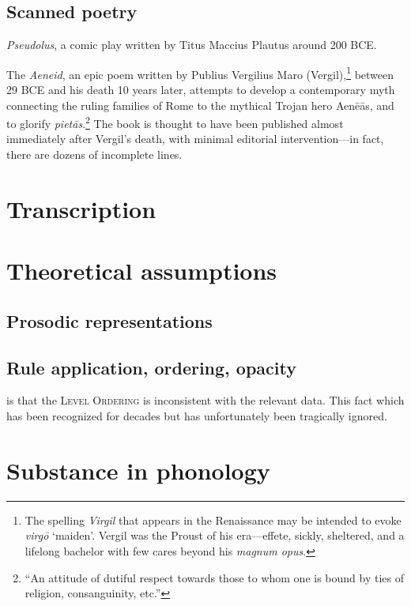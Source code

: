 \subsection{Scanned poetry}

\emph{Pseudolus}, a comic play written by Titus Maccius Plautus around 200 BCE.

The \emph{Aeneid}, an epic poem written by Publius Vergilius Maro (Vergil),\footnote{
    The spelling \emph{Virgil} that appears in the Renaissance may be intended to evoke \emph{virgō} `maiden'. Vergil was the Proust of his era---effete, sickly, sheltered, and a lifelong bachelor with few cares beyond his \emph{magnum opus}.}
between 29 BCE and his death 10 years later, attempts to develop a contemporary myth connecting the ruling families of Rome to the mythical Trojan hero Aenēās, and to glorify \emph{pietās}.\footnote{
    ``An attitude of dutiful respect towards those to whom one is bound by ties of religion, consanguinity, etc.'' }
The book is thought to have been published almost immediately after Vergil's death, with minimal editorial intervention---in fact, there are dozens of incomplete lines.

\section{Transcription}

\section{Theoretical assumptions}

\subsection{Prosodic representations}

\subsection{Rule application, ordering, opacity}

is that the
\textsc{Level Ordering} \citep{Siegel1974} is inconsistent with the relevant data. This fact which has been recognized for decades \citep{Aronoff1976} but has unfortunately been tragically ignored.

\section{Substance in phonology}

